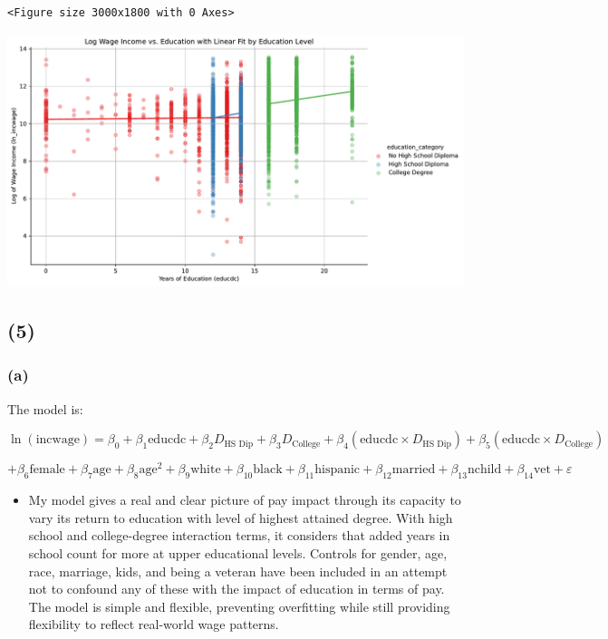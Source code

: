 \documentclass[
  letterpaper,
  DIV=11,
  numbers=noendperiod]{scrartcl}
\providecommand{\tightlist}{%
  \setlength{\itemsep}{0pt}\setlength{\parskip}{0pt}}\usepackage{longtable,booktabs,array}
\begin{document}
\begin{verbatim}
<Figure size 3000x1800 with 0 Axes>
\end{verbatim}

\includegraphics{Mini-Project-1_files/figure-pdf/cell-11-output-2.pdf}

\subsection{(5)}\label{section-5}

\subsubsection{(a)}\label{a-2}

The model is:

\[
\ln(\text{incwage}) = \beta_0 + \beta_1 \text{educdc} + \beta_2 D_{\text{HS Dip}} + \beta_3 D_{\text{College}} + \beta_4 (\text{educdc} \times D_{\text{HS Dip}}) + \beta_5 (\text{educdc} \times D_{\text{College}})
\]

\[
+ \beta_6 \text{female} + \beta_7 \text{age} + \beta_8 \text{age}^2 + \beta_9 \text{white} + \beta_{10} \text{black} + \beta_{11} \text{hispanic} + \beta_{12} \text{married} + \beta_{13} \text{nchild} + \beta_{14} \text{vet} + \varepsilon
\]

\begin{itemize}
\tightlist
\item
  My model gives a real and clear picture of pay impact through its
  capacity to vary its return to education with level of highest
  attained degree. With high school and college-degree interaction
  terms, it considers that added years in school count for more at upper
  educational levels. Controls for gender, age, race, marriage, kids,
  and being a veteran have been included in an attempt not to confound
  any of these with the impact of education in terms of pay. The model
  is simple and flexible, preventing overfitting while still providing
  flexibility to reflect real-world wage patterns.
\end{itemize}
\end{document}
